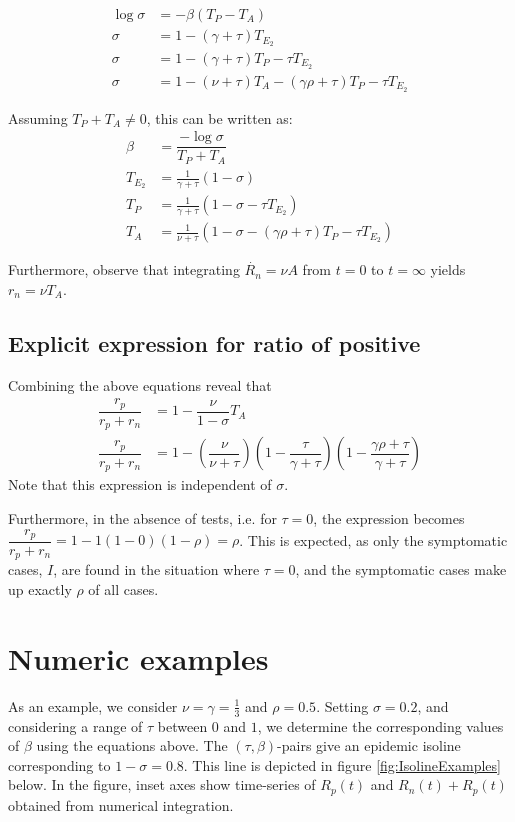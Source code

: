\documentclass[10pt,a4paper]{article}
\begin{document}
\begin{align}
    \log{\sigma} &= - \beta (T_P - T_A) \\
    \sigma &= 1 - (\gamma + \tau) T_{E_2} \\
    \sigma &= 1 -(\gamma + \tau) T_P - \tau T_{E_2} \\
    \sigma &= 1 -(\nu + \tau) T_A -(\gamma \rho + \tau) T_P - \tau T_{E_2} 
\end{align}

Assuming $T_P + T_A \neq 0$, this can be written as:
\begin{align}
    \beta &= \dfrac{-\log \sigma}{T_P + T_A} \\
    T_{E_2} &= \frac{1}{\gamma + \tau} \left(1-\sigma \right)  \\
    T_P &= \frac{1}{\gamma + \tau}\left( 1 - \sigma - \tau T_{E_2} \right)\\
    T_A &= \frac{1}{\nu + \tau} \left(1 - \sigma -(\gamma \rho + \tau) T_P - \tau T_{E_2}\right)
\end{align}


Furthermore, observe that integrating $\dot{R_n} = \nu A$ from $t=0$ to $t=\infty$ yields $r_n = \nu T_A$. 

\subsection{Explicit expression for ratio of positive}
Combining the above equations reveal that 
\begin{align}
    \dfrac{r_p}{r_p+r_n} &= 1 - \dfrac{\nu}{1-\sigma} T_A \\
    \dfrac{r_p}{r_p+r_n} &= 1- \left(\dfrac{\nu}{\nu+ \tau} \right) \left(1- \dfrac{\tau}{\gamma+\tau} \right) \left(1-\dfrac{\gamma \rho + \tau}{\gamma + \tau}\right)
\end{align}
Note that this expression is independent of $\sigma$. 

Furthermore, in the absence of tests, i.e. for $\tau = 0$, the expression becomes $\dfrac{r_p}{r_p+r_n}  = 1- 1(1-0)(1-\rho) = \rho $. This is expected, as only the symptomatic cases, $I$, are found in the situation where $\tau=0$, and the symptomatic cases make up exactly $\rho$ of all cases.


\section{Numeric examples}
As an example, we consider $\nu = \gamma = \frac{1}{3}$ and $\rho = 0.5$. 
Setting $\sigma = 0.2$, and considering a range of $\tau$ between $0$ and $1$, we determine the corresponding values of $\beta$ using the equations above. 
The $(\tau,\beta)$-pairs give an epidemic isoline corresponding to $1-\sigma = 0.8$. This line is depicted in figure \ref{fig:IsolineExamples} below. 
In the figure, inset axes show time-series of $R_p(t)$ and $R_n(t)+R_p(t)$ obtained from numerical integration.
\end{document}
